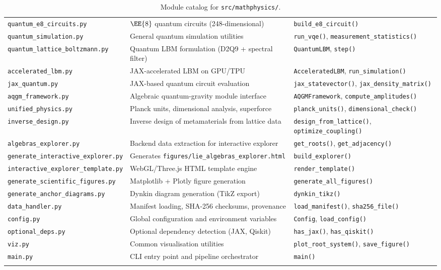 \begin{longtable}{p{4.5cm}p{4cm}p{5cm}}
\texttt{quantum\_e8\_circuits.py} &
    $\EE{8}$ quantum circuits (248-dimensional) &
    \texttt{build\_e8\_circuit()} \\
\texttt{quantum\_simulation.py} &
    General quantum simulation utilities &
    \texttt{run\_vqe()}, \texttt{measurement\_statistics()} \\
\texttt{quantum\_lattice\_boltzmann.py} &
    Quantum LBM formulation (D2Q9 + spectral filter) &
    \texttt{QuantumLBM}, \texttt{step()} \\
\texttt{accelerated\_lbm.py} &
    JAX-accelerated LBM on GPU/TPU &
    \texttt{AcceleratedLBM}, \texttt{run\_simulation()} \\
\texttt{jax\_quantum.py} &
    JAX-based quantum circuit evaluation &
    \texttt{jax\_statevector()}, \texttt{jax\_density\_matrix()} \\
\texttt{aqgm\_framework.py} &
    Algebraic quantum-gravity module interface &
    \texttt{AQGMFramework}, \texttt{compute\_amplitudes()} \\
\texttt{unified\_physics.py} &
    Planck units, dimensional analysis, superforce &
    \texttt{planck\_units()}, \texttt{dimensional\_check()} \\
\texttt{inverse\_design.py} &
    Inverse design of metamaterials from lattice data &
    \texttt{design\_from\_lattice()}, \texttt{optimize\_coupling()} \\
\texttt{algebras\_explorer.py} &
    Backend data extraction for interactive explorer &
    \texttt{get\_roots()}, \texttt{get\_adjacency()} \\
\texttt{generate\_interactive\_explorer.py} &
    Generates \texttt{figures/lie\_algebras\_explorer.html} &
    \texttt{build\_explorer()} \\
\texttt{interactive\_explorer\_template.py} &
    WebGL/Three.js HTML template engine &
    \texttt{render\_template()} \\
\texttt{generate\_scientific\_figures.py} &
    Matplotlib + Plotly figure generation &
    \texttt{generate\_all\_figures()} \\
\texttt{generate\_anchor\_diagrams.py} &
    Dynkin diagram generation (TikZ export) &
    \texttt{dynkin\_tikz()} \\
\texttt{data\_handler.py} &
    Manifest loading, SHA-256 checksums, provenance &
    \texttt{load\_manifest()}, \texttt{sha256\_file()} \\
\texttt{config.py} &
    Global configuration and environment variables &
    \texttt{Config}, \texttt{load\_config()} \\
\texttt{optional\_deps.py} &
    Optional dependency detection (JAX, Qiskit) &
    \texttt{has\_jax()}, \texttt{has\_qiskit()} \\
\texttt{viz.py} &
    Common visualisation utilities &
    \texttt{plot\_root\_system()}, \texttt{save\_figure()} \\
\texttt{main.py} &
    CLI entry point and pipeline orchestrator &
    \texttt{main()} \\
\bottomrule
\caption{Module catalog for \texttt{src/mathphysics/}.}
\label{tab:module_catalog}
\end{longtable}

